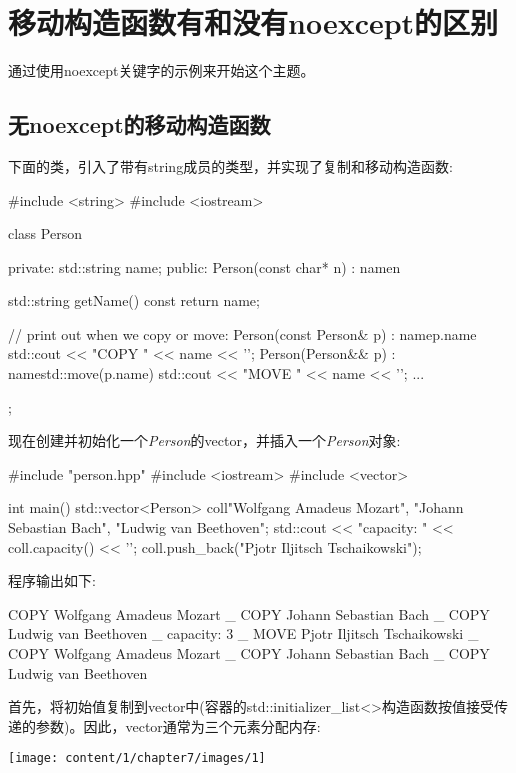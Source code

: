 \section{移动构造函数有和没有noexcept的区别}
通过使用noexcept关键字的示例来开始这个主题。

\subsection{无noexcept的移动构造函数}

下面的类，引入了带有string成员的类型，并实现了复制和移动构造函数:

\begin{cppcode}
#include <string>
#include <iostream>

class Person {
	private:
	std::string name;
	public:
	Person(const char* n)
	: name{n} {
	}

	std::string getName() const {
		return name;
	}

	// print out when we copy or move:
	Person(const Person& p)
	: name{p.name} {
		std::cout << "COPY " << name << '\n';
	}
	Person(Person&& p)
	: name{std::move(p.name)} {
		std::cout << "MOVE " << name << '\n';
	}
	...
};
\end{cppcode}

现在创建并初始化一个\textit{Person}的vector，并插入一个\textit{Person}对象:

\begin{cppcode}
#include "person.hpp"
#include <iostream>
#include <vector>

int main()
{
	std::vector<Person> coll{"Wolfgang Amadeus Mozart",
		"Johann Sebastian Bach",
		"Ludwig van Beethoven"};
	std::cout << "capacity: " << coll.capacity() << '\n';
	coll.push_back("Pjotr Iljitsch Tschaikowski");
}
\end{cppcode}

程序输出如下:

\begin{shell}
COPY Wolfgang Amadeus Mozart _
COPY Johann Sebastian Bach _
COPY Ludwig van Beethoven _
capacity: 3 _
MOVE Pjotr Iljitsch Tschaikowski _
COPY Wolfgang Amadeus Mozart _
COPY Johann Sebastian Bach _
COPY Ludwig van Beethoven
\end{shell}

首先，将初始值复制到vector中(容器的std::initializer_list<>构造函数按值接受传递的参数)。因此，vector通常为三个元素分配内存:

\begin{center}
	\texttt{[image: content/1/chapter7/images/1]}
\end{center}

